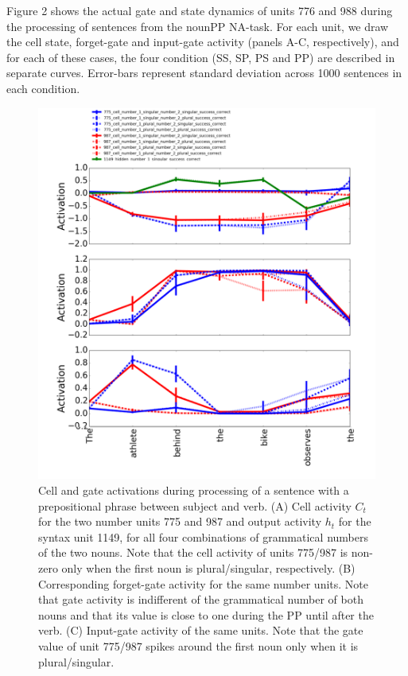 Figure 2 shows the actual gate and state dynamics of units 776 and 988 during the processing of sentences from the nounPP NA-task. For each unit, we draw the cell state, forget-gate and input-gate activity (panels A-C, respectively), and for each of these cases, the four condition (SS, SP, PS and PP) are described in separate curves. Error-bars represent standard deviation across 1000 sentences in each condition.

\begin{figure}[h!]
\includegraphics[width=\linewidth]{Figures/Figure2_number_units.png}
\caption{Cell and gate activations during processing of a sentence with a prepositional phrase between subject and verb. (A) Cell activity $C_t$ for the two number units 775 and 987 and output activity $h_t$ for the syntax unit 1149, for all four combinations of grammatical numbers of the two nouns. Note that the cell activity of units 775/987 is non-zero only when the first noun is plural/singular, respectively. (B) Corresponding forget-gate activity for the same number units. Note that gate activity is indifferent of the grammatical number of both nouns and that its value is close to one during the PP until after the verb. (C) Input-gate activity of the same units. Note that the gate value of unit 775/987 spikes around the first noun only when it is plural/singular.}
\end{figure}

